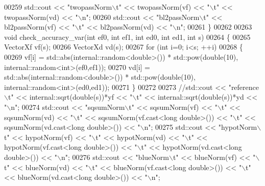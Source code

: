\begin{DoxyCode}
00259   std::cout << \textcolor{stringliteral}{"twopassNorm\(\backslash\)t"} << twopassNorm(vf) << \textcolor{stringliteral}{"\(\backslash\)t"} << twopassNorm(vd) << \textcolor{stringliteral}{"\(\backslash\)n"};
00260   std::cout << \textcolor{stringliteral}{"bl2passNorm\(\backslash\)t"} << bl2passNorm(vf) << \textcolor{stringliteral}{"\(\backslash\)t"} << bl2passNorm(vd) << \textcolor{stringliteral}{"\(\backslash\)n"};
00261 \}
00262 
00263 \textcolor{keywordtype}{void} check\_accuracy\_var(\textcolor{keywordtype}{int} ef0, \textcolor{keywordtype}{int} ef1, \textcolor{keywordtype}{int} ed0, \textcolor{keywordtype}{int} ed1, \textcolor{keywordtype}{int} s)
00264 \{
00265   VectorXf vf(s);
00266   VectorXd vd(s);
00267   \textcolor{keywordflow}{for} (\textcolor{keywordtype}{int} i=0; i<s; ++i)
00268   \{
00269     vf[i] = std::abs(internal::random<double>()) * std::pow(\textcolor{keywordtype}{double}(10), internal::random<int>(ef0,ef1));
00270     vd[i] = std::abs(internal::random<double>()) * std::pow(\textcolor{keywordtype}{double}(10), internal::random<int>(ed0,ed1));
00271   \}
00272 
00273   \textcolor{comment}{//std::cout << "reference\(\backslash\)t" << internal::sqrt(double(s))*yf << "\(\backslash\)t" << internal::sqrt(double(s))*yd <<
       "\(\backslash\)n";}
00274   std::cout << \textcolor{stringliteral}{"sqsumNorm\(\backslash\)t"}  << sqsumNorm(vf)  << \textcolor{stringliteral}{"\(\backslash\)t"} << sqsumNorm(vd)  << \textcolor{stringliteral}{"\(\backslash\)t"} << sqsumNorm(vf.cast<\textcolor{keywordtype}{long}
       \textcolor{keywordtype}{double}>()) << \textcolor{stringliteral}{"\(\backslash\)t"} << sqsumNorm(vd.cast<\textcolor{keywordtype}{long} \textcolor{keywordtype}{double}>()) << \textcolor{stringliteral}{"\(\backslash\)n"};
00275   std::cout << \textcolor{stringliteral}{"hypotNorm\(\backslash\)t"}  << hypotNorm(vf)  << \textcolor{stringliteral}{"\(\backslash\)t"} << hypotNorm(vd)  << \textcolor{stringliteral}{"\(\backslash\)t"} << hypotNorm(vf.cast<\textcolor{keywordtype}{long}
       \textcolor{keywordtype}{double}>()) << \textcolor{stringliteral}{"\(\backslash\)t"} << hypotNorm(vd.cast<\textcolor{keywordtype}{long} \textcolor{keywordtype}{double}>()) << \textcolor{stringliteral}{"\(\backslash\)n"};
00276   std::cout << \textcolor{stringliteral}{"blueNorm\(\backslash\)t"}   << blueNorm(vf)   << \textcolor{stringliteral}{"\(\backslash\)t"} << blueNorm(vd)   << \textcolor{stringliteral}{"\(\backslash\)t"} << blueNorm(vf.cast<\textcolor{keywordtype}{long} \textcolor{keywordtype}{
      double}>()) << \textcolor{stringliteral}{"\(\backslash\)t"} << blueNorm(vd.cast<\textcolor{keywordtype}{long} \textcolor{keywordtype}{double}>()) << \textcolor{stringliteral}{"\(\backslash\)n"};

\end{DoxyCode}
